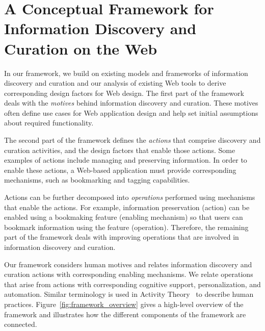 \documentclass{sigchi}
\begin{document}
\section{A Conceptual Framework for Information Discovery and Curation on the Web}
\label{sec:framework}

In our framework, we build on existing models and frameworks of information discovery and curation and our analysis of existing Web tools to derive corresponding design factors for Web design. The first part of the framework deals with the \textit{motives} behind information discovery and curation. These motives often define use cases for Web application design and help set initial assumptions about required functionality.

The second part of the framework defines the \textit{actions} that comprise discovery and curation activities, and the design factors that enable those actions. Some examples of actions include managing and preserving information. In order to enable these actions, a Web-based application must provide corresponding mechanisms, such as bookmarking and tagging capabilities.

Actions can be further decomposed into \textit{operations} performed using mechanisms that enable the actions. For example, information preservation (action) can be enabled using a bookmaking feature (enabling mechanism) so that users can bookmark information using the feature (operation). Therefore, the remaining part of the framework deals with improving operations that are involved in information discovery and curation.  

Our framework considers human motives and relates information discovery and curation actions with corresponding enabling mechanisms. We relate operations that arise from actions with corresponding cognitive support, personalization, and automation.  Similar terminology is used in Activity Theory~\cite{kuutti1996activity} to describe human practices. Figure~\ref{fig:framework_overview} gives a high-level overview of the framework and illustrates how the different components of the framework are connected.
\end{document}
